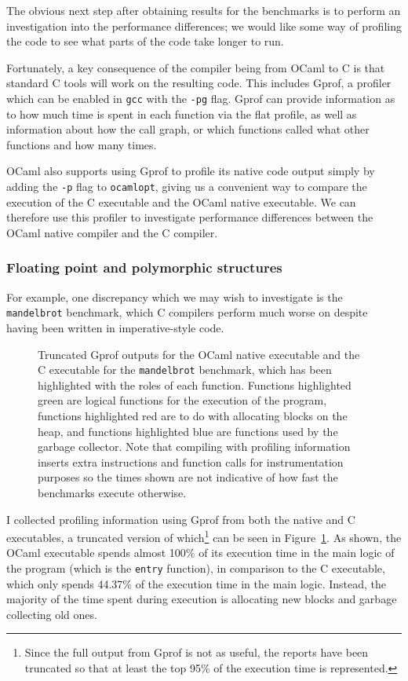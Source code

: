 The obvious next step after obtaining results for the benchmarks is to perform
an investigation into the performance differences; we would like some way of
profiling the code to see what parts of the code take longer to run.

Fortunately, a key consequence of the compiler being from OCaml to C is that
standard C tools will work on the resulting code. This includes Gprof, a
profiler which can be enabled in \texttt{gcc} with the \texttt{-pg} flag. Gprof
can provide information as to how much time is spent in each function via the
flat profile, as well as information about how the call graph, or which
functions called what other functions and how many times.

OCaml also supports using Gprof to profile its native code output simply by
adding the \texttt{-p} flag to \texttt{ocamlopt}, giving us a convenient way to
compare the execution of the C executable and the OCaml native executable. We
can therefore use this profiler to investigate performance differences between
the OCaml native compiler and the C compiler.

\subsubsection{Floating point and polymorphic structures}\label{float-alloc}

For example, one discrepancy which we may wish to investigate is the 
\texttt{mandelbrot} benchmark, which C compilers perform much worse on despite 
having been written in imperative-style code.

\begin{figure}
    \centering
    
    \caption{Truncated Gprof outputs for the OCaml native executable and the C
        executable for the \texttt{mandelbrot} benchmark, which has been
        highlighted with the roles of each function.  Functions highlighted
        green are logical functions for the execution of the program, functions
        highlighted red are to do with allocating blocks on the heap, and
        functions highlighted blue are functions used by the garbage collector.
        Note that compiling with profiling information inserts extra
        instructions and function calls for instrumentation purposes so the
        times shown are not indicative of how fast the benchmarks execute
        otherwise.}\label{fig:mandelbrot-gprof}
\end{figure}

I collected profiling information using Gprof from both the native and C
executables, a truncated version of which\footnote{Since the full output from
Gprof is not as useful, the reports have been truncated so that at least the top
95\% of the execution time is represented.} can be seen in
Figure~\ref{fig:mandelbrot-gprof}. As shown, the OCaml executable spends almost
100\% of its execution time in the main logic of the program (which is the
\texttt{entry} function), in comparison to the C executable, which only spends
44.37\% of the execution time in the main logic. Instead, the majority of the
time spent during execution is allocating new blocks and garbage collecting old
ones.

